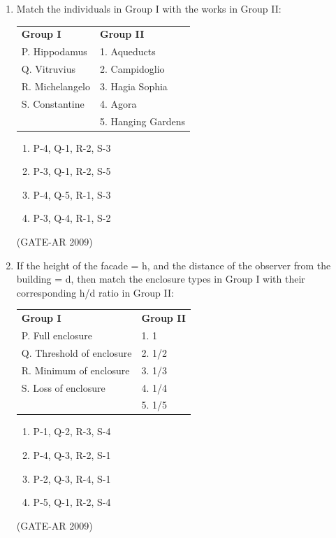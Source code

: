 \documentclass[a4paper,10pt]{article}
\begin{document}
\begin{enumerate}
    \item Match the individuals in Group I with the works in Group II:  \\
    \begin{tabular}{ l l }
	\textbf{Group I} & \textbf{Group II} \\
	P. Hippodamus & 1. Aqueducts \\
	Q. Vitruvius & 2. Campidoglio \\
	R. Michelangelo & 3. Hagia Sophia \\
	S. Constantine & 4. Agora \\
	& 5. Hanging Gardens \\
	\end{tabular}
	\begin{multicols}{2}
	\begin{enumerate}
        \item P-4, Q-1, R-2, S-3
        \item P-3, Q-1, R-2, S-5
        \item P-4, Q-5, R-1, S-3
        \item P-3, Q-4, R-1, S-2
    \end{enumerate}
	\end{multicols}
    \hfill (GATE-AR 2009)
    
    \item If the height of the facade = h, and the distance of the observer from the building = d, then match the enclosure types in Group I with their corresponding h/d ratio in Group II:  \\
    \begin{tabular}{ l l }
	\textbf{Group I} & \textbf{Group II} \\
	P. Full enclosure & 1. 1 \\
	Q. Threshold of enclosure & 2. 1/2 \\
	R. Minimum of enclosure & 3. 1/3 \\
	S. Loss of enclosure & 4. 1/4 \\
	& 5. 1/5 \\
	\end{tabular}
	\begin{multicols}{2}
	\begin{enumerate}
        \item P-1, Q-2, R-3, S-4
        \item P-4, Q-3, R-2, S-1
        \item P-2, Q-3, R-4, S-1
        \item P-5, Q-1, R-2, S-4
    \end{enumerate}
	\end{multicols}
    \hfill (GATE-AR 2009)


\end{enumerate}
\end{document}
